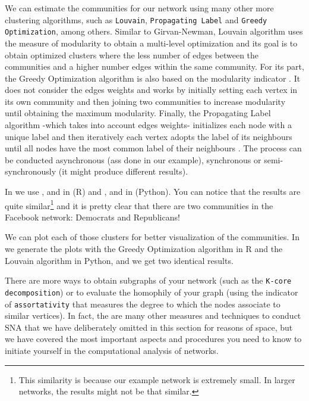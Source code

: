We can estimate the communities for our network using many other more clustering algorithms, such as \texttt{Louvain}, \texttt{Propagating Label} and \texttt{Greedy Optimization}, among others. Similar to Girvan-Newman, Louvain algorithm uses the measure of modularity to obtain a multi-level optimization \citep{blondel2008fast} and its goal is to obtain optimized clusters where the less number of edges between the communities and a higher number edges within the same community. For its part, the Greedy Optimization algorithm is also based on the modularity indicator \citep{clauset2004finding}. It does not consider the edges weights and works by initially setting each vertex in its own community and then joining two communities to increase modularity until obtaining the maximum modularity. Finally, the Propagating Label algorithm -which takes into account edges weights- initializes each node with a unique label and then iteratively each vertex adopts the label of its neighbours until all nodes have the most common label of their neighbours \citep{raghavan2007near}. The process can be conducted asynchronous (ass done in our example), synchronous or semi-synchronously (it might produce different results).

In  we use ,  and  in  (R) and ,  and  in  (Python). You can notice  that the results are quite similar\footnote{This similarity is because our example network is extremely small. In larger networks, the results might not be that similar.}  and it is pretty clear that there are two communities in the Facebook network: Democrats and Republicans!


We can plot each of those clusters for better visualization of the communities. In  we generate the plots with the Greedy Optimization algorithm in R and the Louvain algorithm in Python, and we get two identical results.


There are more ways to obtain subgraphs of your network (such as the \texttt{K-core decomposition}) or to evaluate the homophily of your graph (using the indicator of \texttt{assortativity} that measures the degree to which the nodes associate to similar vertices). In fact, the are many other measures and techniques to conduct SNA that we have deliberately omitted in this section for reasons of space, but we have covered the most important aspects and procedures you need to know to initiate yourself in the computational analysis of networks.

